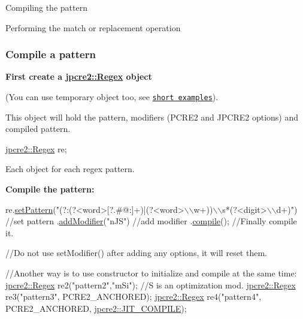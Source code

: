 \begin{DoxyEnumerate}
\item Compiling the pattern
\item Performing the match or replacement operation
\end{DoxyEnumerate}\hypertarget{index_compile-a-pattern}{}\subsubsection{Compile a pattern}\label{index_compile-a-pattern}
{\bfseries First create a {\ttfamily \hyperlink{classjpcre2_1_1Regex}{jpcre2\+::\+Regex}} object}

(You can use temporary object too, see \href{#short-examples}{\tt short examples}).

This object will hold the pattern, modifiers (P\+C\+R\+E2 and J\+P\+C\+R\+E2 options) and compiled pattern.


\begin{DoxyCode}
\hyperlink{classjpcre2_1_1Regex}{jpcre2::Regex} re;
\end{DoxyCode}
 Each object for each regex pattern.

{\bfseries Compile the pattern\+:}


\begin{DoxyCode}
re.\hyperlink{classjpcre2_1_1Regex_a85d9a514ea86ae68533223adac6c6bd8_a85d9a514ea86ae68533223adac6c6bd8}{setPattern}(\textcolor{stringliteral}{"(?:(?<word>[?.#@:]+)|(?<word>\(\backslash\)\(\backslash\)w+))\(\backslash\)\(\backslash\)s*(?<digit>\(\backslash\)\(\backslash\)d+)"})  \textcolor{comment}{//set pattern}
  .\hyperlink{classjpcre2_1_1Regex_ab1af1471339602446d8221b8c97c6b55_ab1af1471339602446d8221b8c97c6b55}{addModifier}(\textcolor{stringliteral}{"nJS"})                                                   \textcolor{comment}{//add modifier}
  .\hyperlink{classjpcre2_1_1Regex_aad1d5ef1e87f762f68a587eec4022e69_aad1d5ef1e87f762f68a587eec4022e69}{compile}();                                                           \textcolor{comment}{//Finally compile it.}

\textcolor{comment}{//Do not use setModifier() after adding any options, it will reset them.}

\textcolor{comment}{//Another way is to use constructor to initialize and compile at the same time:}
\hyperlink{classjpcre2_1_1Regex}{jpcre2::Regex} re2(\textcolor{stringliteral}{"pattern2"},\textcolor{stringliteral}{"mSi"});  \textcolor{comment}{//S is an optimization mod.}
\hyperlink{classjpcre2_1_1Regex}{jpcre2::Regex} re3(\textcolor{stringliteral}{"pattern3"}, PCRE2\_ANCHORED);
\hyperlink{classjpcre2_1_1Regex}{jpcre2::Regex} re4(\textcolor{stringliteral}{"pattern4"}, PCRE2\_ANCHORED, \hyperlink{namespacejpcre2_a85c143271501e383843f45b9999c2f00_a85c143271501e383843f45b9999c2f00a5e8bab7c478015b19baf3e84ed00876e}{jpcre2::JIT\_COMPILE});
\end{DoxyCode}


